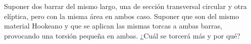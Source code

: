 \documentclass[../main.tex]{subfiles}
\begin{document}
\begin{problema}[3]
	Suponer dos barrar del mismo largo, una de sección transversal
	circular y otra elíptica, pero con la misma área en ambos caso.
	Suponer que son del mismo material Hookeano y que se aplican las mismas
	torcas a ambas barras, provocando una torsión pequeña en ambas. ¿Cuál se
	torcerá más y por qué?
\end{problema}
\end{document}
